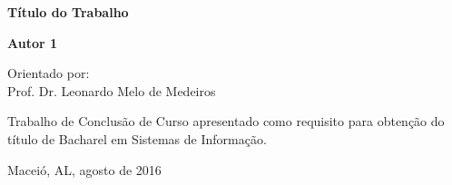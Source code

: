 \begin{titlepage}
\begin{center}
\begin{tabularx}{\linewidth}{ c X }
\end{tabularx}


\vfill

\LARGE

\textbf{Título do Trabalho}

\vfill

\Large

\textbf{Autor 1} \\

\vfill

\normalsize
Orientado por:\\
Prof. Dr. Leonardo Melo de Medeiros\\


\vfill

\hfill
\parbox{0.5\linewidth}{Trabalho de Conclusão de Curso apresentado como requisito para obtenção do título de Bacharel em Sistemas de Informação.}


\vfill

\large

%
%
%

Maceió, AL, agosto de 2016

\end{center}

\end{titlepage}
